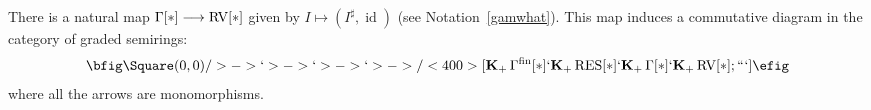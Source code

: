 \documentclass[12pt]{amsart}
\theoremstyle{plain}
\theoremstyle{definition}
\newtheorem{defn}[thm]{Definition}
\theoremstyle{remark}
\numberwithin{equation}{section}
\theoremstyle{plain}
\newcommand{\RV}{\textup{RV}}
\DeclareMathOperator{\id}{id}
\newcommand{\0}{\emptyset}
\newcommand{\fun}{\longrightarrow}
\newcommand{\efun}{\longmapsto}
\newcommand{\mG}{{\mu}{\Gamma}}
\newcommand{\RES}{\textup{RES}}
\DeclareMathOperator{\gsk}{\mathbf{K}_+}
\DeclareMathOperator{\fin}{fin}
\begin{document}
%

There is a natural map $\Gamma[*] \fun \RV[*]$ given by $I \efun (I^\sharp, \id)$ (see Notation~\ref{gamwhat}). This map induces a commutative diagram in the category of graded semirings:
\[
\bfig
 \Square(0,0)/>->`>->`>->`>->/<400>[{\gsk \Gamma^{\fin}[*]}`{\gsk \RES[*]}`{\gsk \Gamma[*]}`{\gsk \RV[*]}; ```]
\efig
\]
where all the arrows are monomorphisms.
\end{document}
